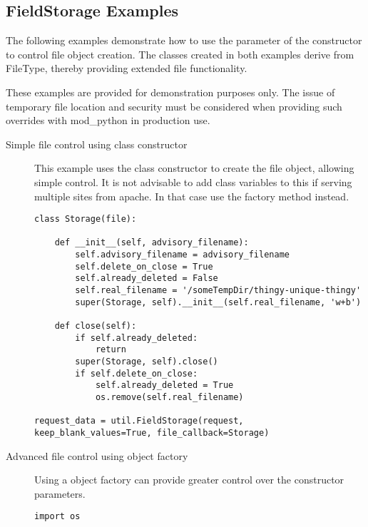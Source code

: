 \subsection{FieldStorage Examples\label{pyapi-util-fstor-examples}}

  The following examples demonstrate how to use the  
  parameter of the  constructor to control file
  object creation. The  classes created in both 
  examples derive from FileType, thereby providing extended file
  functionality.

  These examples are provided for demonstration purposes only. The 
  issue of temporary file location and security must be considered
  when providing such overrides with mod_python in production use.

\begin{description}
  \item[Simple file control using class constructor]

    This example uses the  class constructor to
    create the file object, allowing simple control. It is not 
    advisable to add class variables to this if serving multiple sites
    from apache. In that case use the factory method instead.

\begin{verbatim}
class Storage(file):

    def __init__(self, advisory_filename):
        self.advisory_filename = advisory_filename
        self.delete_on_close = True
        self.already_deleted = False
        self.real_filename = '/someTempDir/thingy-unique-thingy'
        super(Storage, self).__init__(self.real_filename, 'w+b')

    def close(self):
        if self.already_deleted:
            return
        super(Storage, self).close()
        if self.delete_on_close:
            self.already_deleted = True
            os.remove(self.real_filename)

request_data = util.FieldStorage(request, keep_blank_values=True, file_callback=Storage)
\end{verbatim}


  \item[Advanced file control using object factory]

    Using a object factory can provide greater control over the
    constructor parameters.

\begin{verbatim}
import os


\end{verbatim}
\end{description}
